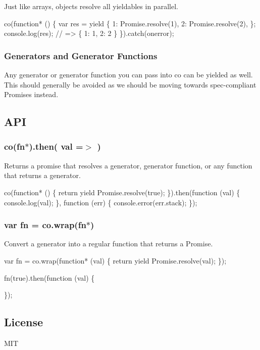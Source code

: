 Just like arrays, objects resolve all {\ttfamily yieldable}s in parallel.


\begin{DoxyCode}
co(function* () \{
  var res = yield \{
    1: Promise.resolve(1),
    2: Promise.resolve(2),
  \};
  console.log(res); // => \{ 1: 1, 2: 2 \}
\}).catch(onerror);
\end{DoxyCode}


\subsubsection*{Generators and Generator Functions}

Any generator or generator function you can pass into {\ttfamily co} can be yielded as well. This should generally be avoided as we should be moving towards spec-\/compliant {\ttfamily Promise}s instead.

\subsection*{A\+PI}

\subsubsection*{co(fn$\ast$).then( val =$>$ )}

Returns a promise that resolves a generator, generator function, or any function that returns a generator.


\begin{DoxyCode}
co(function* () \{
  return yield Promise.resolve(true);
\}).then(function (val) \{
  console.log(val);
\}, function (err) \{
  console.error(err.stack);
\});
\end{DoxyCode}


\subsubsection*{var fn = co.\+wrap(fn$\ast$)}

Convert a generator into a regular function that returns a {\ttfamily Promise}.


\begin{DoxyCode}
var fn = co.wrap(function* (val) \{
  return yield Promise.resolve(val);
\});

fn(true).then(function (val) \{

\});
\end{DoxyCode}


\subsection*{License}

M\+IT 